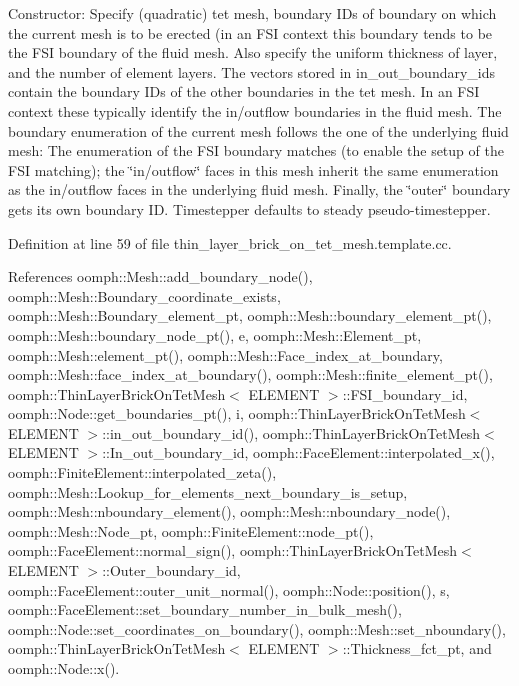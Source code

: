 Constructor\+: Specify (quadratic) tet mesh, boundary I\+Ds of boundary on which the current mesh is to be erected (in an F\+SI context this boundary tends to be the F\+SI boundary of the fluid mesh. Also specify the uniform thickness of layer, and the number of element layers. The vectors stored in in\+\_\+out\+\_\+boundary\+\_\+ids contain the boundary I\+Ds of the other boundaries in the tet mesh. In an F\+SI context these typically identify the in/outflow boundaries in the fluid mesh. The boundary enumeration of the current mesh follows the one of the underlying fluid mesh\+: The enumeration of the F\+SI boundary matches (to enable the setup of the F\+SI matching); the \char`\"{}in/outflow\char`\"{} faces in this mesh inherit the same enumeration as the in/outflow faces in the underlying fluid mesh. Finally, the \char`\"{}outer\char`\"{} boundary gets its own boundary ID. Timestepper defaults to steady pseudo-\/timestepper. 



Definition at line 59 of file thin\+\_\+layer\+\_\+brick\+\_\+on\+\_\+tet\+\_\+mesh.\+template.\+cc.



References oomph\+::\+Mesh\+::add\+\_\+boundary\+\_\+node(), oomph\+::\+Mesh\+::\+Boundary\+\_\+coordinate\+\_\+exists, oomph\+::\+Mesh\+::\+Boundary\+\_\+element\+\_\+pt, oomph\+::\+Mesh\+::boundary\+\_\+element\+\_\+pt(), oomph\+::\+Mesh\+::boundary\+\_\+node\+\_\+pt(), e, oomph\+::\+Mesh\+::\+Element\+\_\+pt, oomph\+::\+Mesh\+::element\+\_\+pt(), oomph\+::\+Mesh\+::\+Face\+\_\+index\+\_\+at\+\_\+boundary, oomph\+::\+Mesh\+::face\+\_\+index\+\_\+at\+\_\+boundary(), oomph\+::\+Mesh\+::finite\+\_\+element\+\_\+pt(), oomph\+::\+Thin\+Layer\+Brick\+On\+Tet\+Mesh$<$ E\+L\+E\+M\+E\+N\+T $>$\+::\+F\+S\+I\+\_\+boundary\+\_\+id, oomph\+::\+Node\+::get\+\_\+boundaries\+\_\+pt(), i, oomph\+::\+Thin\+Layer\+Brick\+On\+Tet\+Mesh$<$ E\+L\+E\+M\+E\+N\+T $>$\+::in\+\_\+out\+\_\+boundary\+\_\+id(), oomph\+::\+Thin\+Layer\+Brick\+On\+Tet\+Mesh$<$ E\+L\+E\+M\+E\+N\+T $>$\+::\+In\+\_\+out\+\_\+boundary\+\_\+id, oomph\+::\+Face\+Element\+::interpolated\+\_\+x(), oomph\+::\+Finite\+Element\+::interpolated\+\_\+zeta(), oomph\+::\+Mesh\+::\+Lookup\+\_\+for\+\_\+elements\+\_\+next\+\_\+boundary\+\_\+is\+\_\+setup, oomph\+::\+Mesh\+::nboundary\+\_\+element(), oomph\+::\+Mesh\+::nboundary\+\_\+node(), oomph\+::\+Mesh\+::\+Node\+\_\+pt, oomph\+::\+Finite\+Element\+::node\+\_\+pt(), oomph\+::\+Face\+Element\+::normal\+\_\+sign(), oomph\+::\+Thin\+Layer\+Brick\+On\+Tet\+Mesh$<$ E\+L\+E\+M\+E\+N\+T $>$\+::\+Outer\+\_\+boundary\+\_\+id, oomph\+::\+Face\+Element\+::outer\+\_\+unit\+\_\+normal(), oomph\+::\+Node\+::position(), s, oomph\+::\+Face\+Element\+::set\+\_\+boundary\+\_\+number\+\_\+in\+\_\+bulk\+\_\+mesh(), oomph\+::\+Node\+::set\+\_\+coordinates\+\_\+on\+\_\+boundary(), oomph\+::\+Mesh\+::set\+\_\+nboundary(), oomph\+::\+Thin\+Layer\+Brick\+On\+Tet\+Mesh$<$ E\+L\+E\+M\+E\+N\+T $>$\+::\+Thickness\+\_\+fct\+\_\+pt, and oomph\+::\+Node\+::x().




